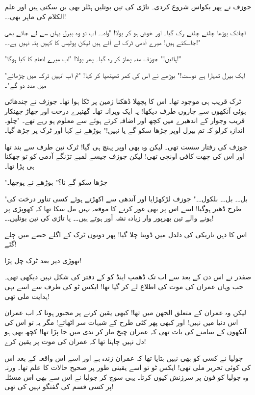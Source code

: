 جوزف نے پھر بکواس شروع کردی۔ تاڑی کی تین بوتلیں ہٹلر بھی بن سکتی ہیں اور علم الکلام کی ماہر بھی۔۔!

اچانک بوڑھا چلتے چلتے رک گیا۔ اور خوش ہو کر بولا! "واہ۔۔ اب تو وہ بیرل یہاں سے لے جائے بھی جاسکتے ہیں! میرے آدمی ٹرک لے آئے ہیں لیکن پولیس کا کہیں پتہ نہیں ہے۔۔!"

"ہائیں!" جوزف منہ پھاڑ کر رہ گیا۔ پھر بولا! "اب میرے انعام کا کیا ہوگا!"

"ایک بیرل تمہارا ہے دوست!" بوڑھے نے اس کی کمر تھپتھپا کر کہا! "تم اب انہیں ٹرک میں چڑھانے میں مدد دو گے"۔

ٹرک قریب ہی موجود تھا۔ اس کا پچھلا ڈھکنا زمین پر ٹکا ہوا تھا۔ جوزف نے چندھائی ہوئی آنکھوں سے چاروں طرف دیکھا! یہ ایک ویرانہ تھا۔ گھنیرے درخت اور جھاڑ جھنکار قریب وجوار کے اندھیرے میں کچھ اور اضافہ کرتے ہوئے سے معلوم ہو رہے تھے۔
"چلو۔ اندازہ کرلو کہ تم بیرل اوپر چڑھا سکو گے یا نہیں!" بوڑھے نے کہا اور ٹرک پر چڑھ گیا۔

جوزف کی رفتار سست تھی۔ لیکن وہ بھی اوپر پہنچ ہی گیا! ٹرک تین طرف سے بند تھا اور اس کی چھت کافی اونچی تھی! لیکن جوزف جیسے لمبے تڑنگے آدمی کو تو جھکنا ہی پڑا تھا۔

"چڑھا سکو گے نا؟" بوڑھے نے پوچھا۔

"بل۔۔ بل۔۔ بلکول۔۔" جوزف لڑکھڑایا اور آندھی سے اکھڑتے ہوئے کسی تناور درخت کی طرح ڈھیر ہوگیا! اسے اس پر بھی غور کرنے کا موقعہ نہیں مل سکا تھا کہ کھوپڑی پر ہونے والے تین بھرپور وار زیادہ نشہ آور ہوتے ہیں۔۔ یا تاڑی کی تین بوتلیں۔۔!

اس کا ذہن تاریکی کی دلدل میں ڈوبتا چلا گیا! پھر دونوں ٹرک کے اگلے حصے میں چلے گئے!

تھوڑی دیر بعد ٹرک چل پڑا!

\endR

\bigskip\bigskip\bigskip

\centerline{}
\bigskip\bigskip\bigskip
\beginR
\body


صفدر نے اس دن کے بعد سے اب تک ڈھمپ اینڈ کو کے دفتر کی شکل نہیں دیکھی تھی۔ جب وہاں عمران کی موت کی اطلاع لے کر گیا تھا! ایکس ٹو کی طرف سے اسے یہی ہدایت ملی تھی!

لیکن وہ عمران کے متعلق الجھن میں تھا! کبھی یقین کرنے پر مجبور ہوتا کہ اب عمران اس دنیا میں نہیں! اور کبھی پھر کئی طرح کے شبہات سر اٹھاتے! مگر یہ تو اس کی آنکھوں کے سامنے کی بات تھی کہ عمران چیخ مار کر ندی میں جا پڑا تھا! کچھ بھی ہو دل نہیں چاہتا تھا کہ عمران کی موت پر یقین کرے!

جولیا نے کسی کو بھی نہیں بتایا تھا کہ عمران زندہ ہے اور اسے اس واقعہ کے بعد اس کی کوئی تحریر ملی تھی! ایکس ٹو تو اسے یقینی طور پر صحیح حالات کا علم تھا۔ ورنہ وہ جولیا کو فون پر سرزنش کیوں کرتا۔ یہی سوچ کر جولیا نے اس سے بھی اس مسئلہ پر کسی قسم کی گفتگو نہیں کی تھی!

